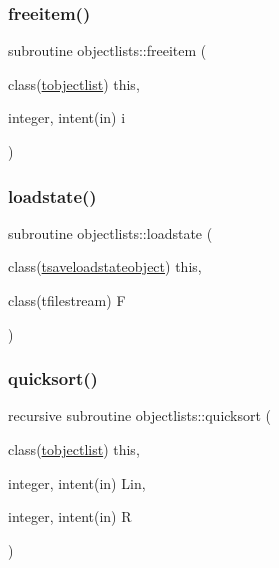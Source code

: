 \subsubsection{\texorpdfstring{freeitem()}{freeitem()}}
{\footnotesize\ttfamily subroutine objectlists\+::freeitem (\begin{DoxyParamCaption}\item[{class(\mbox{\hyperlink{structobjectlists_1_1tobjectlist}{tobjectlist}})}]{this,  }\item[{integer, intent(in)}]{i }\end{DoxyParamCaption})\hspace{0.3cm}{\ttfamily [private]}}

\mbox{\label{namespaceobjectlists_a48fc8838b5a4a323447fdd309cb70d4c}} 
\subsubsection{\texorpdfstring{loadstate()}{loadstate()}}
{\footnotesize\ttfamily subroutine objectlists\+::loadstate (\begin{DoxyParamCaption}\item[{class(\mbox{\hyperlink{structobjectlists_1_1tsaveloadstateobject}{tsaveloadstateobject}})}]{this,  }\item[{class(tfilestream)}]{F }\end{DoxyParamCaption})\hspace{0.3cm}{\ttfamily [private]}}

\mbox{\label{namespaceobjectlists_a3000970aec60eac0c74b465332a4fca2}} 
\subsubsection{\texorpdfstring{quicksort()}{quicksort()}}
{\footnotesize\ttfamily recursive subroutine objectlists\+::quicksort (\begin{DoxyParamCaption}\item[{class(\mbox{\hyperlink{structobjectlists_1_1tobjectlist}{tobjectlist}})}]{this,  }\item[{integer, intent(in)}]{Lin,  }\item[{integer, intent(in)}]{R }\end{DoxyParamCaption})\hspace{0.3cm}{\ttfamily [private]}}

